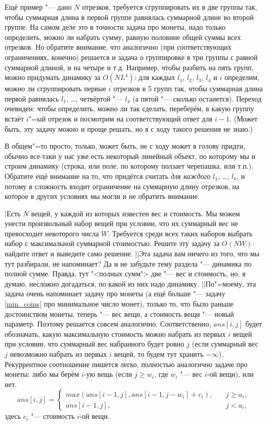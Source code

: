 Ещё пример "--- дано $N$ отрезков, требуется сгруппировать их в две группы так, чтобы суммарная длина в первой 
группе равнялась суммарной длине во второй группе. На самом деле это в точности задача про монеты, надо 
только определить, можно ли набрать сумму, равную половине общей суммы всех отрезков. Но обратите 
внимание, что аналогично (при соответствующих ограничениях, конечно) решается и задача о 
группировке в три группы с равной суммарной длиной, и на четыре и т.д. Например, чтобы разбить на пять групп, 
можно придумать динамику за $O(NL^4)$: для каждых $l_1$, $l_2$, $l_3$, $l_4$ и $i$ определим, можно 
ли сгруппировать первые $i$ отрезков в 5 групп так, чтобы суммарная длина первой равнялась $l_1$, 
\dots, четвёртой "--- $l_4$ (а пятой "--- сколько останется). Переход очевиден: чтобы определить, 
можно ли так сделать, переберём, в какую группу встаёт $i$"=ый отрезок и посмотрим на 
соответствующий ответ для $i-1$. (Может быть, эту задачу можно и проще решать, но я с ходу такого решения 
не знаю.)

В общем"=то просто, только, может быть, не с ходу может в голову придти, обычно все-таки у 
нас уже есть некоторый линейный объект, по которому мы и строим динамику (строка, или поле, по 
которому ползает черепашка, или т.п.). Обратите ещё внимание на то, что 
придётся считать \textit{для каждого} $l_1$, \dots, $l_k$, и потому в сложность входит ограничение 
на суммарную длину отрезков, на которое в других условиях мы могли и не обратить внимание.

\task|Есть $N$ вещей, у каждой из которых известен вес и стоимость. Мы можем унести произвольный набор 
вещей при условии, что их суммарный вес не превосходит некоторого числа $W$. Требуется среди всех 
таких наборов выбрать набор с максимальной суммарной стоимостью. Решите эту задачу за $O(NW)$: 
найдите ответ и выведите само решение.
||Эта задача вам ничего из того, что мы тут разбирали, не напоминает? Да и не забудьте тему раздела 
"--- динамика по полной сумме. Правда, тут "<полных сумм"> две "--- вес и стоимость, но, я думаю, 
несложно догадаться, по какой из них надо динамику.
||По"=моему, эта задача очень напоминает задачу про монеты (а ещё больше "--- задачу 
\ref{min_coins} про минимальное число монет), только то, что было раньше достоинством 
монеты, теперь "--- вес вещи, а стоимость вещи "--- новый параметр. Поэтому решается совсем 
аналогично. Соответственно, $ans[i,j]$ будет обозначать, какую максимальную стоимость можно набрать 
из первых $i$ вещей при условии, что суммарный вес набранного будет ровно $j$ (если суммарный вес 
$j$ невозможно набрать из первых $i$ вещей, то будем тут хранить $-\infty$). Рекуррентное 
соотношение пишется легко, полностью аналогично задаче про монеты: либо мы берём $i$-ую вещь (если 
$j\geq w_i$, где $w_i$ "--- вес $i$-ой вещи), или нет.
$$
ans[i,j]=\left\{
\begin{array}{ll}
max(ans[i-1,j],ans[i-1,j-w_i]+c_i),&\quad j\geq a_i,\\
ans[i-1,j],&\quad j<a_i,
\end{array}\right.
$$
здесь $c_i$ "--- стоимость $i$-ой вещи.


